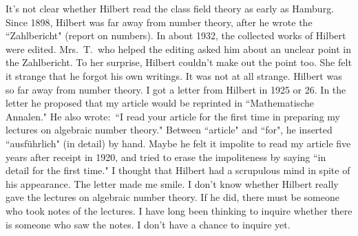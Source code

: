 \documentclass[11pt,a4j,twocolumn]{jarticle}
\begin{document}
It's not clear whether Hilbert read the class field theory as early as Hamburg.
Since 1898, Hilbert was far away from number theory,
after he wrote the ``Zahlbericht" (report on numbers).
In about 1932, the collected works of Hilbert were edited.
Mrs.\ T.\ who helped the editing asked him about an unclear point in the Zahlbericht.
To her surprise, Hilbert couldn't make out the point too.
She felt it strange that he forgot his own writings.
It was not at all strange. Hilbert was so far away from number theory.
I got a letter from Hilbert in 1925 or 26.
In the letter he proposed that my article would be reprinted in ``Mathematische Annalen."
He also wrote:\ ``I read your article for the first time in preparing my lectures on algebraic number theory."
Between ``article" and ``for", he inserted ``ausf\"uhrlich" (in detail) by hand.
Maybe he felt it impolite to read my article five years after receipt in 1920,
and tried to erase the impoliteness by saying ``in detail for the first time."
I thought that Hilbert had a scrupulous mind in spite of his appearance.
The letter made me smile.
I don't know whether Hilbert really gave the lectures on algebraic number theory.
If he did, there must be someone who took notes of the lectures.
I have long been thinking to inquire whether there is someone who saw the notes.
I don't have a chance to inquire yet.
\end{document}

